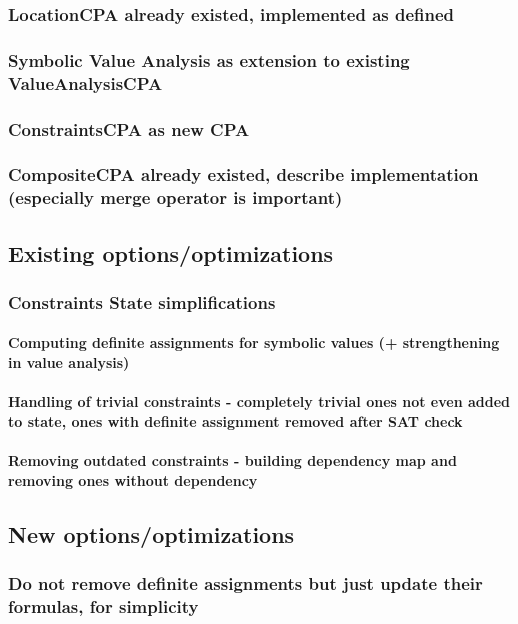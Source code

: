 \documentclass[a4paper,11pt]{article}
\begin{document}
\subsubsection{LocationCPA already existed, implemented as defined}
\subsubsection{Symbolic Value Analysis as extension to existing ValueAnalysisCPA}
\subsubsection{ConstraintsCPA as new CPA}
\subsubsection{CompositeCPA already existed, describe implementation (especially merge operator is important)}

\subsection{Existing options/optimizations}
\subsubsection{Constraints State simplifications}
\paragraph{Computing definite assignments for symbolic values (+ strengthening in value analysis)}
\paragraph{Handling of trivial constraints - completely trivial ones not even added to state, ones with definite assignment removed after SAT check}
\paragraph{Removing outdated constraints - building dependency map and removing ones without dependency}

\subsection{New options/optimizations}
\subsubsection{Do not remove definite assignments but just update their formulas, for simplicity}
\end{document}
